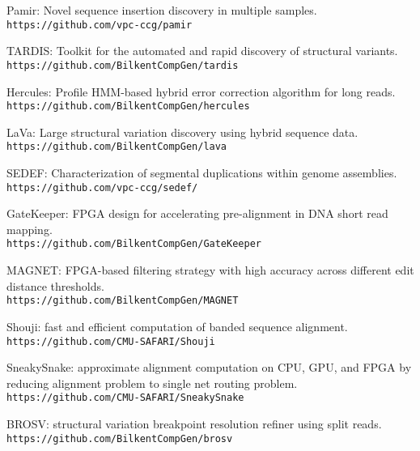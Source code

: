 \begin{list2}
\item
  Pamir: Novel sequence insertion discovery in multiple samples.\\
  {\tt https://github.com/vpc-ccg/pamir}
\item
  TARDIS: Toolkit for the automated and rapid discovery of structural variants.\\
  {\tt https://github.com/BilkentCompGen/tardis}
\item
  Hercules: Profile HMM-based hybrid error correction algorithm for long reads.\\
  {\tt https://github.com/BilkentCompGen/hercules}
\item
  LaVa: Large structural variation discovery using hybrid sequence data.\\
  {\tt https://github.com/BilkentCompGen/lava}
\item
  SEDEF: Characterization of segmental duplications within genome assemblies.\\
  {\tt https://github.com/vpc-ccg/sedef/}
\item
  GateKeeper: FPGA design for accelerating pre-alignment in DNA short read mapping.\\
  {\tt https://github.com/BilkentCompGen/GateKeeper}
\item
  MAGNET: FPGA-based filtering strategy with high accuracy across different edit distance thresholds.\\
  {\tt https://github.com/BilkentCompGen/MAGNET}
\item
  Shouji: fast and efficient computation of banded sequence alignment.\\
  {\tt https://github.com/CMU-SAFARI/Shouji}
\item
  SneakySnake: approximate alignment computation on CPU, GPU, and FPGA by reducing alignment problem to single net routing problem.\\
  {\tt https://github.com/CMU-SAFARI/SneakySnake}
\item
  BROSV: structural variation breakpoint resolution refiner using split reads.\\
  {\tt https://github.com/BilkentCompGen/brosv}
\end{list2}








